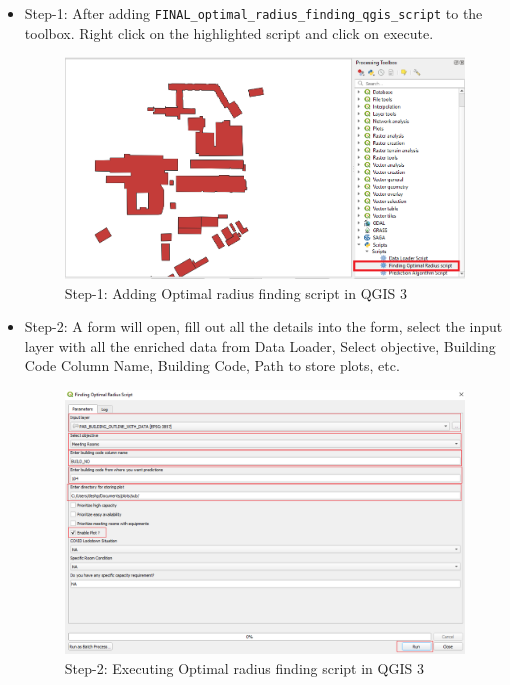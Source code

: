 \begin{itemize}
    \item Step-1: After adding \texttt{FINAL\_optimal\_radius\_finding\_qgis\_script} to the toolbox. Right click on the highlighted script and click on execute.
    
\begin{figure}[H]
\centering
\includegraphics[width=12cm,keepaspectratio=true]{resources/opt1.PNG}
\caption{Step-1: Adding Optimal radius finding script in QGIS 3}
\label{fig:opt1}
\end{figure}
    
\item Step-2: A form will open, fill out all the details into the form,
select the input layer with all the enriched data from Data Loader, Select objective, Building Code Column Name, Building Code, Path to store plots, etc.

\begin{figure}[H]
\centering
\includegraphics[width=12cm,keepaspectratio=true]{resources/opt2.PNG}
\caption{Step-2: Executing Optimal radius finding script in QGIS 3}
\label{fig:opt2}
\end{figure}


\end{itemize}
